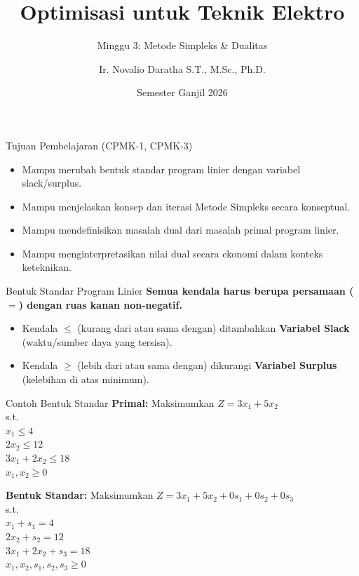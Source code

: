 \documentclass[aspectratio=169]{beamer}
\title{Optimisasi untuk Teknik Elektro}
\subtitle{Minggu 3: Metode Simpleks \& Dualitas}
\author{Ir. Novalio Daratha S.T., M.Sc., Ph.D.}
\date{Semester Ganjil 2026}
\begin{document}
\begin{frame}
    \titlepage
\end{frame}

\begin{frame}{Tujuan Pembelajaran (CPMK-1, CPMK-3)}
    \begin{itemize}
        \item Mampu merubah bentuk standar program linier dengan variabel slack/surplus.
        \item Mampu menjelaskan konsep dan iterasi Metode Simpleks secara konseptual.
        \item Mampu mendefinisikan masalah dual dari masalah primal program linier.
        \item Mampu menginterpretasikan nilai dual secara ekonomi dalam konteks keteknikan.
    \end{itemize}
\end{frame}

\begin{frame}{Bentuk Standar Program Linier}
    \textbf{Semua kendala harus berupa persamaan ($=$) dengan ruas kanan non-negatif.}
    \vspace{0.5cm}
    \begin{itemize}
        \item Kendala $\le$ (kurang dari atau sama dengan) ditambahkan \textbf{Variabel Slack} (waktu/sumber daya yang tersisa).
        \item Kendala $\ge$ (lebih dari atau sama dengan) dikurangi \textbf{Variabel Surplus} (kelebihan di atas minimum).
    \end{itemize}
\end{frame}

\begin{frame}{Contoh Bentuk Standar}
    \textbf{Primal:}
    Maksimumkan $Z = 3x_1 + 5x_2$ \\
    s.t. \\
    $x_1 \le 4$ \\
    $2x_2 \le 12$ \\
    $3x_1 + 2x_2 \le 18$ \\
    $x_1, x_2 \ge 0$
    
    \vspace{0.5cm}
    \textbf{Bentuk Standar:}
    Maksimumkan $Z = 3x_1 + 5x_2 + 0s_1 + 0s_2 + 0s_3$ \\
    s.t. \\
    $x_1 + s_1 = 4$ \\
    $2x_2 + s_2 = 12$ \\
    $3x_1 + 2x_2 + s_3 = 18$ \\
    $x_1, x_2, s_1, s_2, s_3 \ge 0$
\end{frame}
\end{document}
